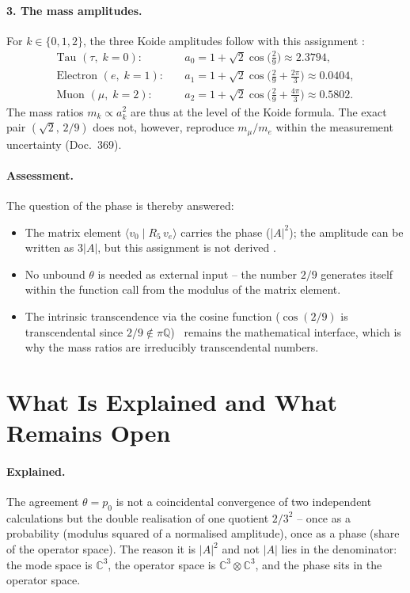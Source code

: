 \paragraph{3. The mass amplitudes.}
For $k\in\{0,1,2\}$, the three Koide amplitudes follow with this
assignment \KM:
\begin{align*}
  \text{Tau }(\tau,\;k=0): &\quad a_0 = 1+\sqrt2\cos\!\bigl(\tfrac{2}{9}\bigr)
    \approx 2{.}3794, \\
  \text{Electron }(e,\;k=1): &\quad a_1 = 1+\sqrt2\cos\!\bigl(\tfrac{2}{9}+\tfrac{2\pi}{3}\bigr)
    \approx 0{.}0404, \\
  \text{Muon }(\mu,\;k=2): &\quad a_2 = 1+\sqrt2\cos\!\bigl(\tfrac{2}{9}+\tfrac{4\pi}{3}\bigr)
    \approx 0{.}5802.
\end{align*}
The mass ratios $m_k \propto a_k^2$ are thus at the level of the Koide formula.
The exact pair $(\sqrt2,\,2/9)$ does not, however, reproduce $m_\mu/m_e$ within the
measurement uncertainty (Doc.~369).

\paragraph{Assessment.}
The question of the phase is thereby answered:
\begin{itemize}
  \item The matrix element $\langle v_0 \mid R_5\, v_e\rangle$ carries the phase
    ($|A|^2$); the amplitude can be written as $3|A|$, but this assignment is
    not derived \SM.
  \item No unbound $\theta$ is needed as external input -- the number $2/9$
    generates itself within the function call from the modulus of the matrix
    element.
  \item The intrinsic transcendence via the cosine function ($\cos(2/9)$ is
    transcendental since $2/9\notin\pi\mathbb{Q}$) \EM\ remains the
    mathematical interface, which is why the mass ratios are irreducibly
    transcendental numbers.
\end{itemize}

\section{What Is Explained and What Remains Open}

\paragraph{Explained.} The agreement $\theta = p_0$ is not a coincidental convergence of two
independent calculations but the double realisation of one quotient $2/3^2$ -- once as a
probability (modulus squared of a normalised amplitude), once as a phase (share of the operator
space). The reason it is $|A|^2$ and not $|A|$ lies in the denominator: the mode space is
$\mathbb{C}^3$, the operator space is $\mathbb{C}^3\otimes\mathbb{C}^3$, and the phase sits in the
operator space.

